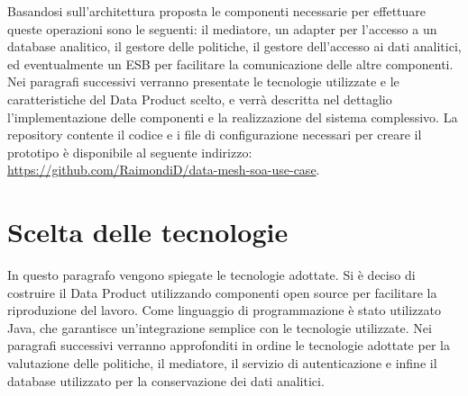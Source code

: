 \documentclass[a4paper,12pt]{report}
\begin{document}
Basandosi sull'architettura proposta le componenti necessarie per effettuare queste operazioni sono le seguenti: il mediatore, un adapter per l'accesso a un database analitico, il gestore delle politiche, il gestore dell'accesso ai dati analitici, ed eventualmente un ESB per facilitare la comunicazione delle altre componenti.
Nei paragrafi successivi verranno presentate le tecnologie utilizzate e le caratteristiche del Data Product scelto, e  verrà descritta nel dettaglio l'implementazione delle componenti e la realizzazione del sistema complessivo.
La repository contente il codice e i file di configurazione necessari per creare il prototipo è disponibile al seguente indirizzo: \url{https://github.com/RaimondiD/data-mesh-soa-use-case}.

\section{Scelta delle tecnologie}
In questo paragrafo vengono spiegate le tecnologie adottate.
Si è deciso di costruire il Data Product utilizzando componenti open source per facilitare la riproduzione del lavoro.
Come linguaggio di programmazione è stato utilizzato Java, che garantisce un'integrazione semplice con le tecnologie utilizzate.
Nei paragrafi successivi verranno approfonditi in ordine le tecnologie adottate per la valutazione delle politiche, il mediatore, il servizio di autenticazione e infine il database utilizzato per la conservazione dei dati analitici.
\end{document}
